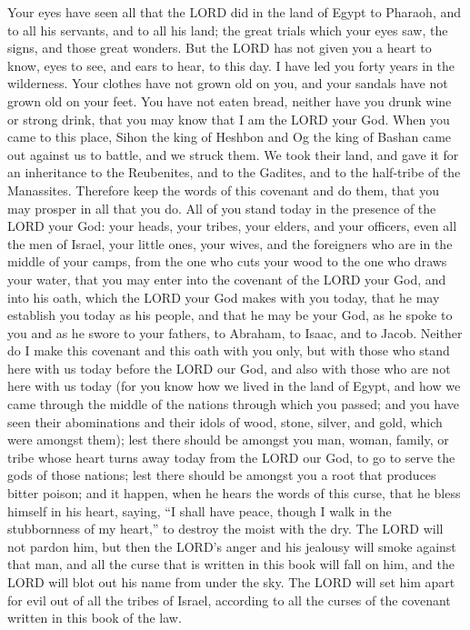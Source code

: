 Your eyes have seen all that the LORD did in the land of Egypt to
Pharaoh, and to all his servants, and to all his land;  the
great trials which your eyes saw, the signs, and those great wonders.
 But the LORD has not given you a heart to know, eyes to
see, and ears to hear, to this day.  I have led you forty
years in the wilderness. Your clothes have not grown old on you, and
your sandals have not grown old on your feet.  You have not
eaten bread, neither have you drunk wine or strong drink, that you may
know that I am the LORD your God.  When you came to this
place, Sihon the king of Heshbon and Og the king of Bashan came out
against us to battle, and we struck them.  We took their
land, and gave it for an inheritance to the Reubenites, and to the
Gadites, and to the half-tribe of the Manassites.  Therefore
keep the words of this covenant and do them, that you may prosper in all
that you do.  All of you stand today in the presence of the
LORD your God: your heads, your tribes, your elders, and your officers,
even all the men of Israel,  your little ones, your wives,
and the foreigners who are in the middle of your camps, from the one who
cuts your wood to the one who draws your water,  that you
may enter into the covenant of the LORD your God, and into his oath,
which the LORD your God makes with you today,  that he may
establish you today as his people, and that he may be your God, as he
spoke to you and as he swore to your fathers, to Abraham, to Isaac, and
to Jacob.  Neither do I make this covenant and this oath
with you only,  but with those who stand here with us today
before the LORD our God, and also with those who are not here with us
today  (for you know how we lived in the land of Egypt, and
how we came through the middle of the nations through which you passed;
 and you have seen their abominations and their idols of
wood, stone, silver, and gold, which were amongst them); 
lest there should be amongst you man, woman, family, or tribe whose
heart turns away today from the LORD our God, to go to serve the gods of
those nations; lest there should be amongst you a root that produces
bitter poison;  and it happen, when he hears the words of
this curse, that he bless himself in his heart, saying, ``I shall have
peace, though I walk in the stubbornness of my heart,'' to destroy the
moist with the dry.  The LORD will not pardon him, but then
the LORD's anger and his jealousy will smoke against that man, and all
the curse that is written in this book will fall on him, and the LORD
will blot out his name from under the sky.  The LORD will
set him apart for evil out of all the tribes of Israel, according to all
the curses of the covenant written in this book of the law.

